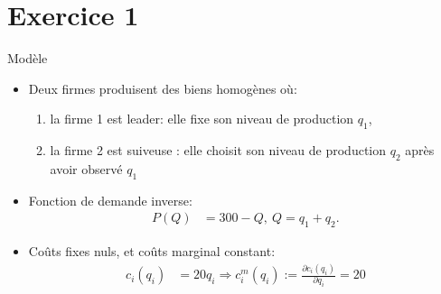 \begin{frame}
\titlepage
\end{frame}



\section{Exercice 1}
\frame{\sectionpage}

\begin{frame}[allowframebreaks]{Modèle}
\begin{itemize}
\item Deux firmes produisent des biens homogènes où: 
\begin{enumerate}[-]
\item la firme 1 est leader:  elle fixe son niveau de production $q_1$,
\item la firme 2 est suiveuse : elle choisit son niveau de production $q_2$ après avoir observé $q_1$
\end{enumerate}
\item Fonction de demande inverse: 
\begin{align}
    P(Q) &= 300 - Q, \ Q=q_1+q_2.
\label{eq1}
\end{align}
\item Coûts fixes nuls, et coûts marginal constant:
\begin{align}
    c_i(q_i) &= 20q_i \Rightarrow c^{m}_i(q_i) :=\frac{\partial c_i(q_i)}{\partial q_i} = 20
    \label{eq2}
\end{align}
\end{itemize}
\end{frame}

